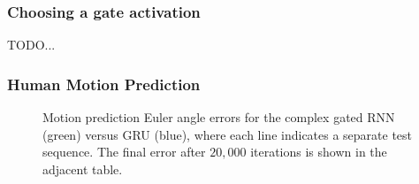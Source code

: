 \documentclass{article}
\begin{document}
\subsubsection{Choosing a gate activation}
TODO...


\subsubsection{Human Motion Prediction}
\begin{figure}[b]
    \centering
    \caption{\small Motion prediction Euler angle errors for the complex gated RNN (green) versus GRU (blue), where each line indicates a separate test sequence.  The final error after $20,000$ iterations is shown in the adjacent table.}
    \label{fig:euler}
\end{figure}
\end{document}

